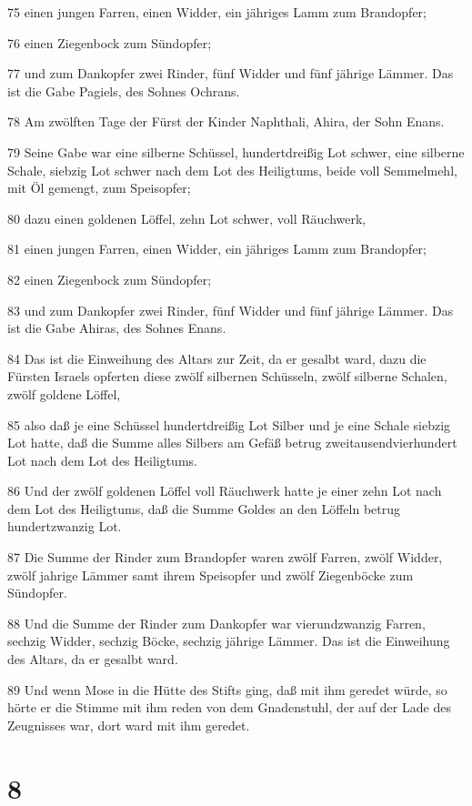 \par 75 einen jungen Farren, einen Widder, ein jähriges Lamm zum Brandopfer;
\par 76 einen Ziegenbock zum Sündopfer;
\par 77 und zum Dankopfer zwei Rinder, fünf Widder und fünf jährige Lämmer. Das ist die Gabe Pagiels, des Sohnes Ochrans.
\par 78 Am zwölften Tage der Fürst der Kinder Naphthali, Ahira, der Sohn Enans.
\par 79 Seine Gabe war eine silberne Schüssel, hundertdreißig Lot schwer, eine silberne Schale, siebzig Lot schwer nach dem Lot des Heiligtums, beide voll Semmelmehl, mit Öl gemengt, zum Speisopfer;
\par 80 dazu einen goldenen Löffel, zehn Lot schwer, voll Räuchwerk,
\par 81 einen jungen Farren, einen Widder, ein jähriges Lamm zum Brandopfer;
\par 82 einen Ziegenbock zum Sündopfer;
\par 83 und zum Dankopfer zwei Rinder, fünf Widder und fünf jährige Lämmer. Das ist die Gabe Ahiras, des Sohnes Enans.
\par 84 Das ist die Einweihung des Altars zur Zeit, da er gesalbt ward, dazu die Fürsten Israels opferten diese zwölf silbernen Schüsseln, zwölf silberne Schalen, zwölf goldene Löffel,
\par 85 also daß je eine Schüssel hundertdreißig Lot Silber und je eine Schale siebzig Lot hatte, daß die Summe alles Silbers am Gefäß betrug zweitausendvierhundert Lot nach dem Lot des Heiligtums.
\par 86 Und der zwölf goldenen Löffel voll Räuchwerk hatte je einer zehn Lot nach dem Lot des Heiligtums, daß die Summe Goldes an den Löffeln betrug hundertzwanzig Lot.
\par 87 Die Summe der Rinder zum Brandopfer waren zwölf Farren, zwölf Widder, zwölf jahrige Lämmer samt ihrem Speisopfer und zwölf Ziegenböcke zum Sündopfer.
\par 88 Und die Summe der Rinder zum Dankopfer war vierundzwanzig Farren, sechzig Widder, sechzig Böcke, sechzig jährige Lämmer. Das ist die Einweihung des Altars, da er gesalbt ward.
\par 89 Und wenn Mose in die Hütte des Stifts ging, daß mit ihm geredet würde, so hörte er die Stimme mit ihm reden von dem Gnadenstuhl, der auf der Lade des Zeugnisses war, dort ward mit ihm geredet.

\chapter{8}

